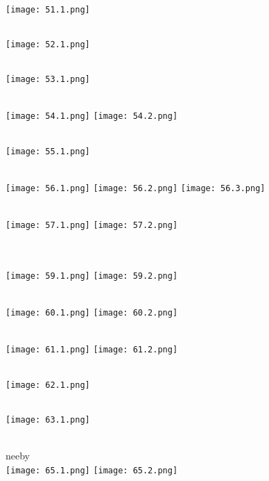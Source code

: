 \documentclass[a4paper,14pt]{extreport}
\begin{document}
\begin{landscape}
\hypertarget{17v}{}\\[1cm]
\texttt{[image: 51.1.png]}

\hypertarget{18v}{}\\[1cm]
\texttt{[image: 52.1.png]}

\hypertarget{19v}{}\\[1cm]
\texttt{[image: 53.1.png]}

\hypertarget{20v}{}\\[1cm]
\texttt{[image: 54.1.png]}
\texttt{[image: 54.2.png]}

\hypertarget{21v}{}\\[1cm]
\texttt{[image: 55.1.png]}

\hypertarget{22v}{}\\
\texttt{[image: 56.1.png]}
\texttt{[image: 56.2.png]}
\texttt{[image: 56.3.png]}

\hypertarget{23v}{}\\[1cm]
\texttt{[image: 57.1.png]}
\texttt{[image: 57.2.png]}

\hypertarget{24v}{}\\[1cm]

\hypertarget{25v}{}\\[1cm]
\texttt{[image: 59.1.png]}
\texttt{[image: 59.2.png]}

\hypertarget{26v}{}\\[1cm]
\texttt{[image: 60.1.png]}
\texttt{[image: 60.2.png]}

\hypertarget{27v}{}\\[1cm]
\texttt{[image: 61.1.png]}
\texttt{[image: 61.2.png]}

\hypertarget{28v}{}\\[1cm]
\texttt{[image: 62.1.png]}

\hypertarget{29v}{}\\[1cm]
\texttt{[image: 63.1.png]}

\hypertarget{30v}{}\\[1cm]
neeby
\newpage
\hypertarget{31v}{}\\[1cm]
\texttt{[image: 65.1.png]}
\texttt{[image: 65.2.png]}


\end{landscape}
\end{document}
